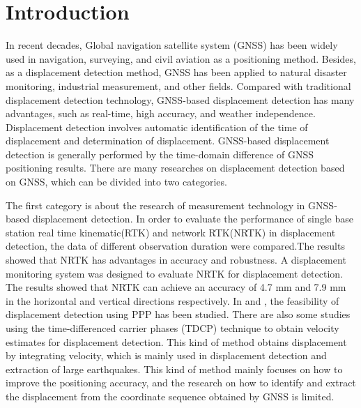 \documentclass{svjour3}                     %
\begin{document}
\section{Introduction}
\label{intro}
In recent decades, Global navigation satellite system (GNSS) has been widely used in navigation, surveying, and civil aviation as a positioning method\citep{teunissen2017springer}. 
Besides, as a displacement detection method, GNSS has been applied to natural disaster monitoring\citep{awange2012environmental}, industrial measurement\citep{pavasovic2011application}, and other fields. 
Compared with traditional displacement detection technology, GNSS-based displacement detection has many advantages, such as real-time, high accuracy, and weather independence\citep{shen2019a}. 
Displacement detection involves automatic identification of the time of displacement and determination of displacement. 
GNSS-based displacement detection is generally performed by the time-domain difference of GNSS positioning results. There are many researches on displacement detection based on GNSS, which can be divided into two categories.


The first category is about the research of measurement technology in GNSS-based displacement detection.
In order to evaluate the performance of single base station real time kinematic(RTK) and network RTK(NRTK) in displacement detection, the data of different observation duration were compared\citep{wang2011gps}.The results showed that NRTK has advantages in accuracy and robustness.
A displacement monitoring system was designed to evaluate NRTK for displacement detection\citep{GUMUS2019131}. The results showed that NRTK can achieve an accuracy of 4.7 mm and 7.9 mm in the horizontal and vertical directions respectively.
In \cite{csanliouglu2016landslide} and \cite{lytvyn2012real}, the feasibility of displacement detection using PPP has been studied. There are also some studies using the time-differenced carrier phases (TDCP) technique\citep{freda2015time,colosimo2011real} to obtain velocity estimates for displacement detection. This kind of method obtains displacement by integrating velocity, which is mainly used in displacement detection and extraction of large earthquakes.
This kind of method mainly focuses on how to improve the positioning accuracy, and the research on how to identify and extract the displacement from the coordinate sequence obtained by GNSS is limited.
\end{document}
